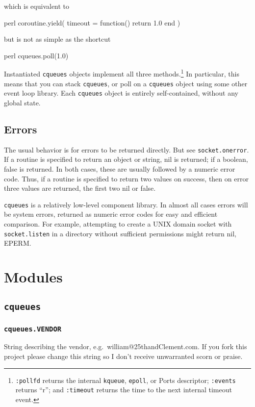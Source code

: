 \documentclass[11pt, oneside]{memoir}
\newcommand*{\cqueues}[0]{\texttt{cqueues}\xspace}
\newcommand*{\syscall}[1]{\texttt{#1}\xspace}
\newcommand*{\routine}[1]{\texttt{#1}\xspace}
\newcommand*{\method}[1]{\texttt{#1}\xspace}
\begin{document}
which is equivalent to

\begin{code}{perl}
	coroutine.yield({ timeout = function() return 1.0 end })
\end{code}

but is not as simple as the shortcut

\begin{code}{perl}
	cqueues.poll(1.0)
\end{code}

Instantiated \cqueues objects implement all three methods.\footnote{\method{:pollfd} returns the internal \syscall{kqueue}, \syscall{epoll}, or Ports descriptor; \method{:events} returns ``r''; and \method{:timeout} returns the time to the next internal timeout event.} In particular, this means that you can stack \cqueues, or poll on a \cqueues object using some other event loop library. Each \cqueues object is entirely self-contained, without any global state.


\subsection{Errors}

The usual behavior is for errors to be returned directly. But see \routine{socket.onerror}. If a routine is specified to return an object or string, nil is returned; if a boolean, false is returned. In both cases, these  are usually followed by a numeric error code. Thus, if a routine is specified to return two values on success, then on error three values are returned, the first two nil or false.

\cqueues is a relatively low-level component library. In almost all cases errors will be system errors, returned as numeric error codes for easy and efficient comparison. For example, attempting to create a UNIX domain socket with \routine{socket.listen} in a directory without sufficient permissions might return nil, EPERM.


\section{Modules}

\subsection{\cqueues}

\subsubsection{\routine{cqueues.VENDOR}}
String describing the vendor, e.g.\ william@25thandClement.com. If you fork this project please change this string so I don't receive unwarranted scorn or praise.
\end{document}
